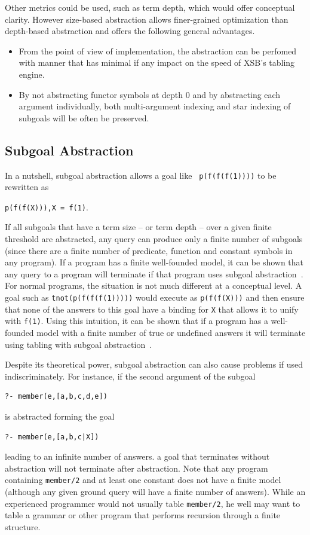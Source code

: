 Other metrics could be used, such as term depth, which would offer
conceptual clarity.  However size-based abstraction allows
finer-grained optimization than depth-based abstraction and offers the
following general advantages.
\begin{itemize}
\item From the point of view of implementation, the abstraction can be
  perfomed with manner that has minimal if any impact on the speed of
  XSB's tabling engine. 
\item By not abstracting functor symbols at depth 0 and by abstracting
  each argument individually, both multi-argument indexing and star
  indexing of subgoals will be often be preserved.
\end{itemize}

\subsection{Subgoal Abstraction} \label{sec:subg-abs}
%
In a nutshell, subgoal abstraction allows a goal like {\tt
  p(f(f(f(1))))} to be rewritten as 

{\tt p(f(f(X))),X = f(1)}.  

\noindent
If all subgoals that have a term size -- or term depth -- over a given
finite threshold are abstracted, any query can produce only a finite
number of subgoals (since there are a finite number of predicate,
function and constant symbols in any program). If a program has a
finite well-founded model, it can be shown that any query to a program
will terminate if that program uses subgoal abstraction~\cite{RigS14}.
%
For normal programs, the situation is not much different at a
conceptual level.  A goal such as {\tt tnot(p(f(f(f(1)))))} would
execute as {\tt p(f(f(X)))} and then ensure that none of the answers
to this goal have a binding for {\tt X} that allows it to unify with
{\tt f(1)}.  Using this intuition, it can be shown that if a program
has a well-founded model with a finite number of true or undefined
answers it will terminate using tabling with subgoal
abstraction~\cite{RigS13,RigS14}.

Despite its theoretical power, subgoal abstraction can also cause
problems if used indiscriminately.  For instance, if the second
argument of the subgoal
%
\begin{verbatim}
?- member(e,[a,b,c,d,e])
\end{verbatim}
%
is abstracted forming the goal
%
\begin{verbatim}
?- member(e,[a,b,c|X])
\end{verbatim}
%
leading to an infinite number of answers.  a goal that terminates
without abstraction will not terminate after abstraction.  Note that
any program containing {\tt member/2} and at least one constant does
not have a finite model (although any given ground query will have a
finite number of answers).  While an experienced programmer would not
usually table {\tt member/2}, he well may want to table a grammar or
other program that performs recursion through a finite structure.

